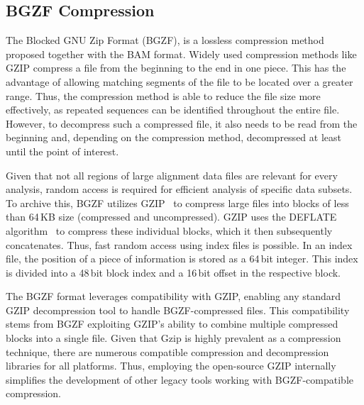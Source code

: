 \subsection{BGZF Compression} \label{bgzf}
The Blocked GNU Zip Format (BGZF), is a lossless compression method proposed together with the BAM format. Widely used compression methods like GZIP compress a file from the beginning to the end in one piece. This has the advantage of allowing matching segments of the file to be located over a greater range. Thus, the compression method is able to reduce the file size more effectively, as repeated sequences can be identified throughout the entire file. However, to decompress such a compressed file, it also needs to be read from the beginning and, depending on the compression method, decompressed at least until the point of interest. 

Given that not all regions of large alignment data files are relevant for every analysis, random access is required for efficient analysis of specific data subsets. To archive this, BGZF utilizes GZIP~\cite{gzip} to compress large files into blocks of less than 64\,KB size (compressed and uncompressed). GZIP uses the DEFLATE algorithm~\cite{deflate} to compress these individual blocks, which it then subsequently concatenates. Thus, fast random access using index files is possible. In an index file, the position of a piece of information is stored as a 64\,bit integer. This index is divided into a 48\,bit block index and a 16\,bit offset in the respective block.

The BGZF format leverages compatibility with GZIP, enabling any standard GZIP decompression tool to handle BGZF-compressed files. This compatibility stems from BGZF exploiting GZIP's ability to combine multiple compressed blocks into a single file. Given that Gzip is highly prevalent as a compression technique, there are numerous compatible compression and decompression libraries for all platforms. Thus, employing the open-source GZIP internally simplifies the development of other legacy tools working with BGZF-compatible compression.  

